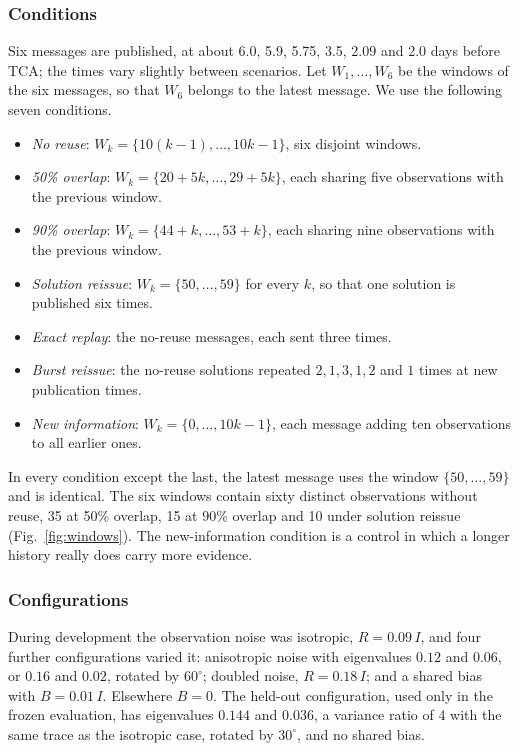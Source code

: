 \documentclass[conference]{IEEEtran}
\begin{document}
\subsubsection*{Conditions}
Six messages are published, at about 6.0, 5.9, 5.75, 3.5, 2.09 and 2.0 days before TCA; the times vary slightly between scenarios. Let $W_1,\dots,W_6$ be the windows of the six messages, so that $W_6$ belongs to the latest message. We use the following seven conditions.
\begin{itemize}
\item \emph{No reuse}: $W_k=\{10(k-1),\dots,10k-1\}$, six disjoint windows.
\item \emph{50\% overlap}: $W_k=\{20+5k,\dots,29+5k\}$, each sharing five observations with the previous window.
\item \emph{90\% overlap}: $W_k=\{44+k,\dots,53+k\}$, each sharing nine observations with the previous window.
\item \emph{Solution reissue}: $W_k=\{50,\dots,59\}$ for every $k$, so that one solution is published six times.
\item \emph{Exact replay}: the no-reuse messages, each sent three times.
\item \emph{Burst reissue}: the no-reuse solutions repeated $2,1,3,1,2$ and $1$ times at new publication times.
\item \emph{New information}: $W_k=\{0,\dots,10k-1\}$, each message adding ten observations to all earlier ones.
\end{itemize}
In every condition except the last, the latest message uses the window $\{50,\dots,59\}$ and is identical. The six windows contain sixty distinct observations without reuse, 35 at 50\% overlap, 15 at 90\% overlap and 10 under solution reissue (Fig.~\ref{fig:windows}). The new-information condition is a control in which a longer history really does carry more evidence.

\subsubsection*{Configurations}
During development the observation noise was isotropic, $R=0.09\,I$, and four further configurations varied it: anisotropic noise with eigenvalues $0.12$ and $0.06$, or $0.16$ and $0.02$, rotated by $60^\circ$; doubled noise, $R=0.18\,I$; and a shared bias with $B=0.01\,I$. Elsewhere $B=0$. The held-out configuration, used only in the frozen evaluation, has eigenvalues $0.144$ and $0.036$, a variance ratio of 4 with the same trace as the isotropic case, rotated by $30^\circ$, and no shared bias.
\end{document}
